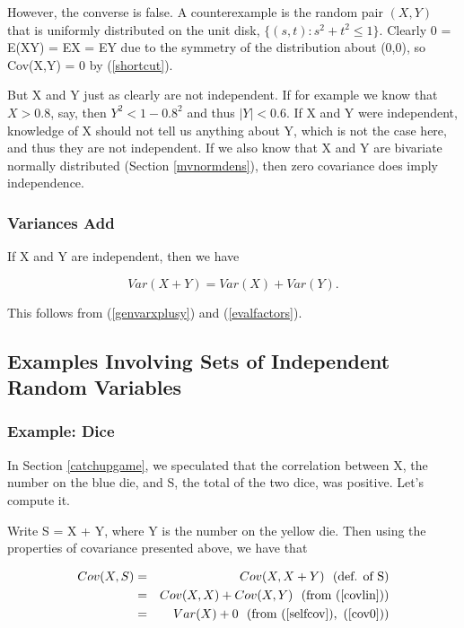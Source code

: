 However, the converse is false.  A counterexample is the random pair
$(X,Y)$ that is uniformly distributed on the unit disk, $\{(s,t):
s^2+t^2 \leq 1\}$.  Clearly 0 = E(XY) = EX = EY due to the symmetry of
the distribution about (0,0), so Cov(X,Y) = 0 by (\ref{shortcut}).  

But X and Y just as clearly are not independent.  If for example we know that
$X > 0.8$, say, then $Y^2 < 1 - 0.8^2$ and thus $|Y| < 0.6$.  If X and Y
were independent, knowledge of X should not tell us anything about Y,
which is not the case here, and thus they are not independent.  If we
also know that X and Y are bivariate normally distributed (Section
\ref{mvnormdens}), then zero covariance does imply independence.

\subsubsection{Variances Add}

If X and Y are independent, then we have

\begin{equation}
\label{covsadd}
Var(X+Y) = Var(X) + Var(Y).
\end{equation}

This follows from (\ref{genvarxplusy}) and (\ref{evalfactors}). 

\subsection{Examples Involving Sets of Independent Random Variables}

\subsubsection{Example:  Dice}
\label{diceex}

In Section \ref{catchupgame}, we speculated that the correlation between
X, the number on the blue die, and S, the total of the two dice, was
positive.  Let's compute it.

Write S = X + Y, where Y is the number on the yellow die.  Then
using the properties of covariance presented above, we have that 

\begin{eqnarray}
Cov(X,S) &=& Cov(X,X+Y) ~~ (\textrm{def. of S}) \\ 
&=& Cov(X,X) + Cov(X,Y) ~~ (\textrm{from } (\ref{covlin})) \\
&=& Var(X) + 0 ~~ (\textrm{from } (\ref{selfcov}),~ (\ref{cov0}))
\end{eqnarray}

